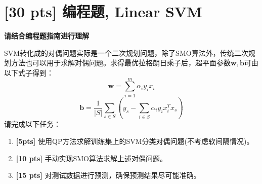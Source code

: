 \documentclass[a4paper,UTF8]{article}
\theoremstyle{definition}
\begin{document}
\section{[30 pts] 编程题, Linear SVM}
\textbf{请结合编程题指南进行理解}

SVM转化成的对偶问题实际是一个二次规划问题，除了SMO算法外，传统二次规划方法也可以用于求解对偶问题。求得最优拉格朗日乘子后，超平面参数$\mathbf{w,b}$可由以下式子得到：
\begin{equation}
\mathbf{w} = \sum_{i=1}^m \alpha_i y_i x_i
\end{equation}
\begin{equation}
\mathbf{b} = \frac{1}{|S|}\sum_{s\in S} (y_s-\sum_{i\in S}\alpha_i y_i x_i^T x_s)
\end{equation}
请完成以下任务：
\begin{enumerate}[(1)]
	\item \textbf{[5pts]} 使用QP方法求解训练集上的SVM分类对偶问题(不考虑软间隔情况)。
	\item \textbf{[10 pts]} 手动实现SMO算法求解上述对偶问题。
	\item \textbf{[15 pts]} 对测试数据进行预测，确保预测结果尽可能准确。
\end{enumerate}
\end{document}
